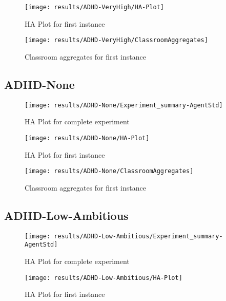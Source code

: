 \begin{figure}[H]
    \centering
    \texttt{[image: results/ADHD-VeryHigh/HA-Plot]}
    \caption{HA Plot for first instance}
\end{figure}

\begin{figure}[H]
    \centering
    \texttt{[image: results/ADHD-VeryHigh/ClassroomAggregates]}
    \caption{Classroom aggregates for first instance}
    \label{result:VH-Classroom}
\end{figure}


\subsection{ADHD-None}

\begin{figure}[H]
    \centering
    \texttt{[image: results/ADHD-None/Experiment\_summary-AgentStd]}
    \caption{HA Plot for complete experiment}
\end{figure}

\begin{figure}[H]
    \centering
    \texttt{[image: results/ADHD-None/HA-Plot]}
    \caption{HA Plot for first instance}
\end{figure}

\begin{figure}[H]
    \centering
    \texttt{[image: results/ADHD-None/ClassroomAggregates]}
    \caption{Classroom aggregates for first instance}
    \label{result:N-Classroom}
\end{figure}

\subsection{ADHD-Low-Ambitious}

\begin{figure}[H]
    \centering
    \texttt{[image: results/ADHD-Low-Ambitious/Experiment\_summary-AgentStd]}
    \caption{HA Plot for complete experiment}
\end{figure}

\begin{figure}[H]
    \centering
    \texttt{[image: results/ADHD-Low-Ambitious/HA-Plot]}
    \caption{HA Plot for first instance}
\end{figure}

